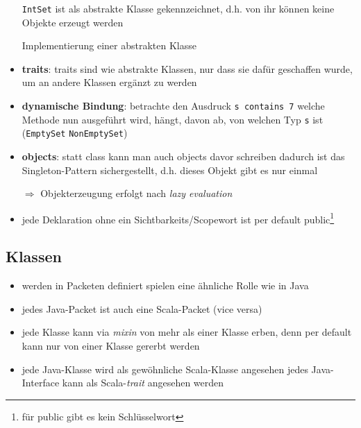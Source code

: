 \begin{itemize}
  
  
  \texttt{IntSet} ist als abstrakte Klasse gekennzeichnet, d.h. von ihr können
  keine Objekte erzeugt werden
  
  Implementierung einer abstrakten Klasse
  
  
  
  \item \textbf{traits}: traits sind wie abstrakte Klassen, nur dass sie
  dafür geschaffen wurde, um an andere Klassen ergänzt zu werden
  
  
  \item \textbf{dynamische Bindung}: betrachte den Ausdruck 
  \texttt{s contains 7} \und welche Methode nun ausgeführt wird, hängt, davon
  ab, von welchen Typ \texttt{s} ist (\texttt{EmptySet} \oder 
  \texttt{NonEmptySet})
  \item \textbf{objects}: statt class kann man auch objects davor schreiben
  \und dadurch ist das Singleton-Pattern sichergestellt, d.h. dieses
  Objekt gibt es nur einmal
  
  
  
  $\Rightarrow$ Objekterzeugung erfolgt nach \textit{lazy evaluation}
  \item jede Deklaration ohne ein Sichtbarkeits/Scopewort ist per default
  public\footnote{für public gibt es kein Schlüsselwort}
\end{itemize}



\subsection{Klassen}
\begin{itemize}
  \item werden in Packeten definiert \und spielen eine ähnliche Rolle wie
  in Java
  \item jedes Java-Packet ist auch eine Scala-Packet (vice versa)
  \item jede Klasse kann via \textit{mixin} von mehr als einer Klasse
  erben, denn per default kann nur von einer Klasse gererbt werden
  \item jede Java-Klasse wird als gewöhnliche Scala-Klasse angesehen \und 
  jedes Java-Interface kann als Scala-\textit{trait} angesehen werden
\end{itemize}


